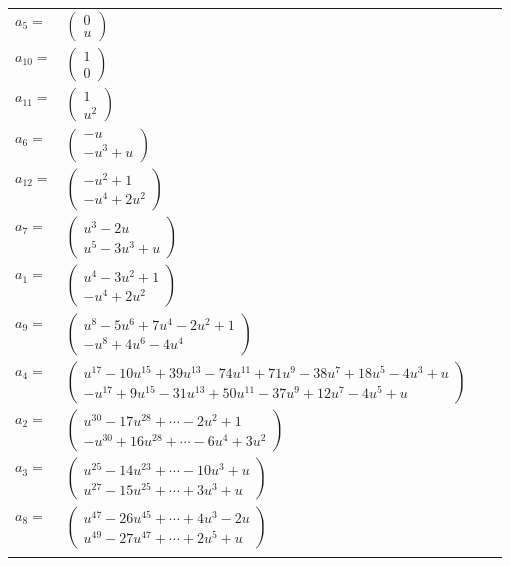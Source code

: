 \documentclass[1p]{elsarticle_modified}
\theoremstyle{definition}
\begin{document}
\begin{tabular}{m{7pt} m{180pt} m{7pt} m{180pt} }
\flushright $a_{5}=$&$\begin{pmatrix}0\\u\end{pmatrix}$ \\
\flushright $a_{10}=$&$\begin{pmatrix}1\\0\end{pmatrix}$ \\
\flushright $a_{11}=$&$\begin{pmatrix}1\\u^2\end{pmatrix}$ \\
\flushright $a_{6}=$&$\begin{pmatrix}- u\\- u^3+u\end{pmatrix}$ \\
\flushright $a_{12}=$&$\begin{pmatrix}- u^2+1\\- u^4+2 u^2\end{pmatrix}$ \\
\flushright $a_{7}=$&$\begin{pmatrix}u^3-2 u\\u^5-3 u^3+u\end{pmatrix}$ \\
\flushright $a_{1}=$&$\begin{pmatrix}u^4-3 u^2+1\\- u^4+2 u^2\end{pmatrix}$ \\
\flushright $a_{9}=$&$\begin{pmatrix}u^8-5 u^6+7 u^4-2 u^2+1\\- u^8+4 u^6-4 u^4\end{pmatrix}$ \\
\flushright $a_{4}=$&$\begin{pmatrix}u^{17}-10 u^{15}+39 u^{13}-74 u^{11}+71 u^9-38 u^7+18 u^5-4 u^3+u\\- u^{17}+9 u^{15}-31 u^{13}+50 u^{11}-37 u^9+12 u^7-4 u^5+u\end{pmatrix}$ \\
\flushright $a_{2}=$&$\begin{pmatrix}u^{30}-17 u^{28}+\cdots-2 u^2+1\\- u^{30}+16 u^{28}+\cdots-6 u^4+3 u^2\end{pmatrix}$ \\
\flushright $a_{3}=$&$\begin{pmatrix}u^{25}-14 u^{23}+\cdots-10 u^3+u\\u^{27}-15 u^{25}+\cdots+3 u^3+u\end{pmatrix}$ \\
\flushright $a_{8}=$&$\begin{pmatrix}u^{47}-26 u^{45}+\cdots+4 u^3-2 u\\u^{49}-27 u^{47}+\cdots+2 u^5+u\end{pmatrix}$\\&\end{tabular}
\end{document}
